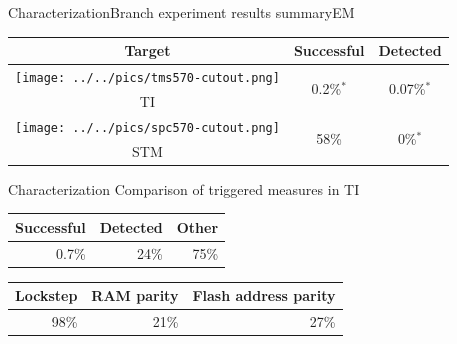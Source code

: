 \documentclass[table]{beamer}
\begin{document}
\begin{frame}{Characterization}{Branch experiment results summary}{EM}
    \begin{table}[H]
          \centering
          \begin{tabular}{c c c}
          \toprule
            \cellcolor{white!100} Target & Successful & Detected \\
            \midrule
            \texttt{[image: ../../pics/tms570-cutout.png]} & \multirow{ 2}{*}{0.2\%$^*$} & \multirow{ 2}{*}{0.07\%$^*$} \\ TI & &\\
            \cmidrule{1-3}
            \texttt{[image: ../../pics/spc570-cutout.png]} & \multirow{ 2}{*}{58\%} & \multirow{ 2}{*}{0\%$^*$} \\ STM& &\\
          \bottomrule
          \end{tabular}
    \end{table}
\end{frame}

\begin{frame}{Characterization}{ Comparison of triggered measures in TI}
    
    \begin{table}[H]
          \centering
          \begin{tabular}{r r r}
          \toprule
            Successful & Detected & Other \\
            \midrule
            0.7\% & 24\% & 75\% \\
          \bottomrule
          \end{tabular}
    \end{table}

    \begin{table}[H]
          \centering
          \begin{tabular}{ r r r}
          \toprule
             Lockstep & RAM parity & Flash address parity \\
            \midrule
             98\% & 21\% & 27\% \\
          \bottomrule
          \end{tabular}
    \end{table}

\end{frame}
\end{document}
